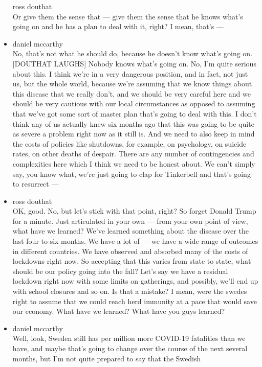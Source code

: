\begin{itemize}
  ross douthat\\
  Or give them the sense that --- give them the sense that he knows
  what's going on and he has a plan to deal with it, right? I mean,
  that's ---
\item
  daniel mccarthy\\
  No, that's not what he should do, because he doesn't know what's going
  on. {[}DOUTHAT LAUGHS{]} Nobody knows what's going on. No, I'm quite
  serious about this. I think we're in a very dangerous position, and in
  fact, not just us, but the whole world, because we're assuming that we
  know things about this disease that we really don't, and we should be
  very careful here and we should be very cautious with our local
  circumstances as opposed to assuming that we've got some sort of
  master plan that's going to deal with this. I don't think any of us
  actually knew six months ago that this was going to be quite as severe
  a problem right now as it still is. And we need to also keep in mind
  the costs of policies like shutdowns, for example, on psychology, on
  suicide rates, on other deaths of despair. There are any number of
  contingencies and complexities here which I think we need to be honest
  about. We can't simply say, you know what, we're just going to clap
  for Tinkerbell and that's going to resurrect ---
\item
  ross douthat\\
  OK, good. No, but let's stick with that point, right? So forget Donald
  Trump for a minute. Just articulated in your own --- from your own
  point of view, what have we learned? We've learned something about the
  disease over the last four to six months. We have a lot of --- we have
  a wide range of outcomes in different countries. We have observed and
  absorbed many of the costs of lockdowns right now. So accepting that
  this varies from state to state, what should be our policy going into
  the fall? Let's say we have a residual lockdown right now with some
  limits on gatherings, and possibly, we'll end up with school closures
  and so on. Is that a mistake? I mean, were the swedes right to assume
  that we could reach herd immunity at a pace that would save our
  economy. What have we learned? What have you guys learned?
\item
  daniel mccarthy\\
  Well, look, Sweden still has per million more COVID-19 fatalities than
  we have, and maybe that's going to change over the course of the next
  several months, but I'm not quite prepared to say that the Swedish

\end{itemize}
